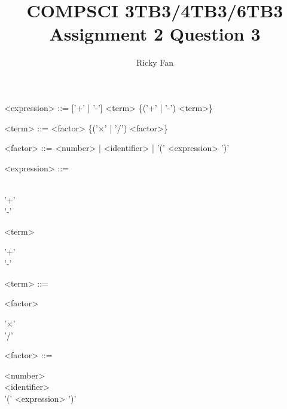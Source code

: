 \documentclass{article}
\title{COMPSCI 3TB3/4TB3/6TB3 Assignment 2 Question 3}
\author{Ricky Fan}
\begin{document}
\maketitle

\begin{grammar}
    <expression> ::= ['+' | '-'] <term> \{('+' | '-') <term>\}
 
   <term> ::= <factor> \{('$\times$' | '/') <factor>\}
 
   <factor> ::= <number> | <identifier> | '(' <expression> ')'
\end{grammar}

\begin{grammar}
    <expression> ::=
    \begin{syntdiag} %
        \begin{stack} \\
            '+' \\
            '-'
        \end{stack}
        \begin{rep}
            <term> \\
            \begin{stack} 
                '+' \\
                '-'
            \end{stack}
        \end{rep}
    \end{syntdiag}

    <term> ::=
    \begin{syntdiag} %
        \begin{rep}
            <factor> \\
            \begin{stack} 
                '$\times$' \\
                '/'
            \end{stack}
        \end{rep}
    \end{syntdiag}

    <factor> ::=
    \begin{syntdiag} %
        \begin{stack} 
            <number> \\
            <identifier> \\
            '(' <expression> ')'
        \end{stack}
    \end{syntdiag}
\end{grammar}

\end{document}
